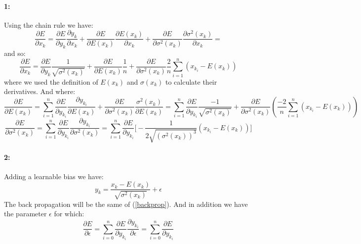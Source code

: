 \documentclass{article}
\begin{document}
\paragraph{1:} Using the chain rule we have:
$$
\frac{\partial E}{\partial x_k}=\frac{\partial E}{\partial y_k}\frac{\partial y_k}{\partial x_k}+
\frac{\partial E}{\partial E(x_k)}\frac{\partial E(x_k)}{\partial x_k}+
\frac{\partial E}{\partial \sigma^2(x_k)}\frac{\partial \sigma^2(x_k)}{\partial x_k}=
$$
and so:
\begin{equation}\label{backprop}
\frac{\partial E}{\partial x_k}=\frac{\partial E}{\partial y_k}\frac{1}{\sqrt{	\sigma^2(x_k)}}+\frac{\partial E}{\partial E(x_k)}	\frac{1}{n}+
\frac{\partial E}{\partial \sigma^2(x_k)}\frac{2}{n}	\sum_{i=1}^{n}(x_{k_i}-E(x_k))
\end{equation}
where we used the definition of $E(x_k)$ and $\sigma(x_k)$ to calculate their derivatives. And where:
$$
\frac{\partial E}{\partial E(x_k)}=\sum_{i=1}^n \frac{\partial E}{	\partial y_{k_i}}
\frac{\partial y_{k_i}}{{\partial E(x_k)}}+
\frac{\partial E}{	\partial\sigma^2(x_k)}
\frac{\sigma^2(x_k)}{{\partial E(x_k)}}=
\sum_{i=1}^n \frac{\partial E}{	\partial y_{k_i}}	\frac{-1}{\sqrt{	\sigma^2(x_k)}}+
\frac{\partial E}{	\partial\sigma^2(x_k)}(\frac{-2}{n}\sum_{i=1}^n(x_{k_i} -E(x_k)))
$$
$$
\frac{\partial E}{	\partial\sigma^2(x_k)}=
\sum_{i=1}^n \frac{\partial E}{\partial y_{k_i}}
\frac{\partial y_{k_i}}{{\partial \sigma^2(x_k) }}=
\sum_{i=1}^n \frac{\partial E}{\partial y_{k_i}}	\big[-\frac{1}{2\sqrt{(\sigma^2(x_k))^3}} (x_{k_i}-E(x_k))\big]
$$
\paragraph{2:}Adding a learnable bias we have:
$$
y_k=	\frac{x_k-E(x_k)}{\sqrt{\sigma^2(x_k)}}+\epsilon
$$ 
The back propagation will be the same of (\ref{backprop}). And in addition we have the parameter $\epsilon$ for which:
$$
\frac{\partial E}{\partial \epsilon}=\sum_{i=0}^{n}\frac{\partial E}{\partial y_{k_i}}\frac{ \partial y_{k_i}}{\partial \epsilon}=
\sum_{i=0}^{n}\frac{\partial E}{\partial y_{k_i}}
$$
\end{document}
